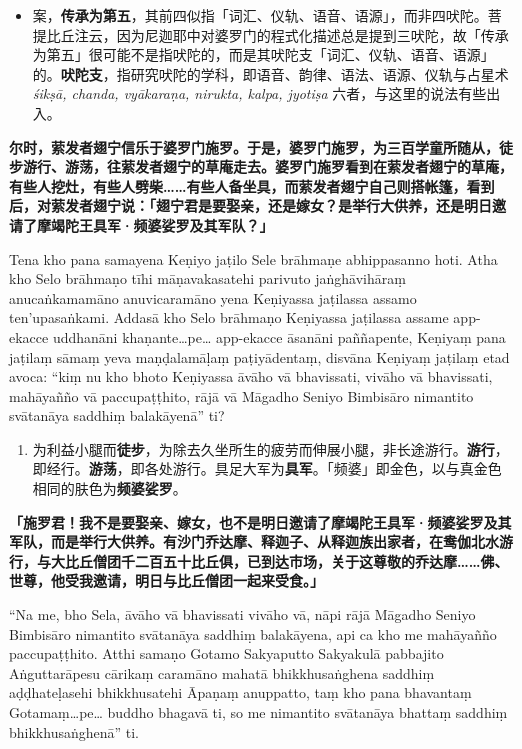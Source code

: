 \begin{itemize}\item 案，\textbf{传承为第五}，其前四似指「词汇、仪轨、语音、语源」，而非四吠陀。菩提比丘注云，因为尼迦耶中对婆罗门的程式化描述总是提到三吠陀，故「传承为第五」很可能不是指吠陀的，而是其吠陀支「词汇、仪轨、语音、语源」的。\textbf{吠陀支}，指研究吠陀的学科，即语音、韵律、语法、语源、仪轨与占星术 \textit{śikṣā, chanda, vyākaraṇa, nirukta, kalpa, jyotiṣa} 六者，与这里的说法有些出入。\end{itemize}

\textbf{尔时，萦发者翅宁信乐于婆罗门施罗。于是，婆罗门施罗，为三百学童所随从，徒步游行、游荡，往萦发者翅宁的草庵走去。婆罗门施罗看到在萦发者翅宁的草庵，有些人挖灶，有些人劈柴……有些人备坐具，而萦发者翅宁自己则搭帐篷，看到后，对萦发者翅宁说：「翅宁君是要娶亲，还是嫁女？是举行大供养，还是明日邀请了摩竭陀王具军·频婆娑罗及其军队？」}

Tena kho pana samayena Keṇiyo jaṭilo Sele brāhmaṇe abhippasanno hoti. Atha kho Selo brāhmaṇo tīhi māṇavakasatehi parivuto jaṅghāvihāraṃ anucaṅkamamāno anuvicaramāno yena Keṇiyassa jaṭilassa assamo ten’upasaṅkami. Addasā kho Selo brāhmaṇo Keṇiyassa jaṭilassa assame app-ekacce uddhanāni khaṇante…pe… app-ekacce āsanāni paññapente, Keṇiyaṃ pana jaṭilaṃ sāmaṃ yeva maṇḍalamāḷaṃ paṭiyādentaṃ, disvāna Keṇiyaṃ jaṭilaṃ etad avoca: “kiṃ nu kho bhoto Keṇiyassa āvāho vā bhavissati, vivāho vā bhavissati, mahāyañño vā paccupaṭṭhito, rājā vā Māgadho Seniyo Bimbisāro nimantito svātanāya saddhiṃ balakāyenā” ti?

\begin{enumerate}\item 为利益小腿而\textbf{徒步}，为除去久坐所生的疲劳而伸展小腿，非长途游行。\textbf{游行}，即经行。\textbf{游荡}，即各处游行。具足大军为\textbf{具军}。「频婆」即金色，以与真金色相同的肤色为\textbf{频婆娑罗}。\end{enumerate}

\textbf{「施罗君！我不是要娶亲、嫁女，也不是明日邀请了摩竭陀王具军·频婆娑罗及其军队，而是举行大供养。有沙门乔达摩、释迦子、从释迦族出家者，在鸯伽北水游行，与大比丘僧团千二百五十比丘俱，已到达市场，关于这尊敬的乔达摩……佛、世尊，他受我邀请，明日与比丘僧团一起来受食。」}

“Na me, bho Sela, āvāho vā bhavissati vivāho vā, nāpi rājā Māgadho Seniyo Bimbisāro nimantito svātanāya saddhiṃ balakāyena, api ca kho me mahāyañño paccupaṭṭhito. Atthi samaṇo Gotamo Sakyaputto Sakyakulā pabbajito Aṅguttarāpesu cārikaṃ caramāno mahatā bhikkhusaṅghena saddhiṃ aḍḍhateḷasehi bhikkhusatehi Āpaṇaṃ anuppatto, taṃ kho pana bhavantaṃ Gotamaṃ…pe… buddho bhagavā ti, so me nimantito svātanāya bhattaṃ saddhiṃ bhikkhusaṅghenā” ti.

